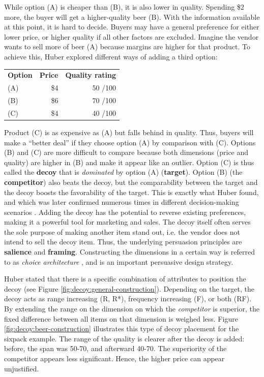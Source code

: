 While option (A) is cheaper than (B), it is also lower in quality. Spending \$2 more, the buyer will get a higher-quality beer (B). With the information available at this point, it is hard to decide. 
Buyers may have a general preference for either lower price, or higher quality if all other factors are excluded. Imagine the vendor wants to sell more of beer (A) because margins are higher for that product. To achieve this, Huber \etal explored different ways of adding a third option:
\begin{table}[!h]
\begin{tabular}{lrr}
	\textbf{Option} & \textbf{Price} & \textbf{Quality rating}\\
	(A) & \$4 & 50 \small{/100} \\
	(B) & \$6 & 70 \small{/100}\\
	(C) & \$4 & 40 \small{/100} \\
\end{tabular} 
\end{table}

Product (C) is as expensive as (A) but falls behind in quality. Thus, buyers will make a ``better deal'' if they choose option (A) by comparison with (C). Options (B) and (C) are more difficult to compare because both dimensions (price and quality) are higher in (B) and make it appear like an outlier. Option (C) is thus called the \textbf{decoy} that is \textit{dominated} by option (A) (\textbf{target}). Option (B) (the \textbf{competitor}) also beats the decoy, but the comparability between the target and the decoy boosts the favorability of the target. This is exactly what Huber \etal found, and which was later confirmed numerous times in different decision-making scenarios \cite{Ariely1995ExplanationSubjectiveDominance}. Adding the decoy has the potential to reverse existing preferences, making it a powerful tool for marketing and sales. The decoy itself often serves the sole purpose of making another item stand out, i.e. the vendor does not intend to sell the decoy item. Thus, the underlying persuasion principles are \textbf{salience} and \textbf{framing}. Constructing the dimensions in a certain way is referred to as \textit{choice architecture} \cite{Thaler2010ChoiceArchitecture}, and is an important persuasive design strategy. 

Huber \etal stated that there is a specific combination of attributes to position the decoy (see Figure \ref{fig:decoy:general-construction}). Depending on the target, the decoy acts as range increasing (R, R*), frequency increasing (F), or both (RF). By extending the range on the dimension on which the \textit{competitor} is superior, the fixed difference between all items on that dimension is weighed less. Figure \ref{fig:decoy:beer-construction} illustrates this type of decoy placement for the sixpack example. The range of the quality is clearer after the decoy is added: before, the span was 50-70, and afterward 40-70. The superiority of the competitor appears less significant. Hence, the higher price can appear unjustified. 

